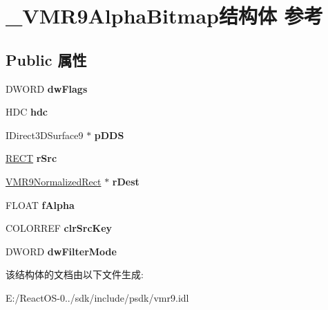 \hypertarget{struct___v_m_r9_alpha_bitmap}{}\section{\+\_\+\+V\+M\+R9\+Alpha\+Bitmap结构体 参考}
\label{struct___v_m_r9_alpha_bitmap}
\subsection*{Public 属性}
\begin{DoxyCompactItemize}
\item 
\mbox{\label{struct___v_m_r9_alpha_bitmap_a636a27f18c993a3f0f634394f131d313}} 
D\+W\+O\+RD {\bfseries dw\+Flags}
\item 
\mbox{\label{struct___v_m_r9_alpha_bitmap_aec73d22084421d7662538f43f9017186}} 
H\+DC {\bfseries hdc}
\item 
\mbox{\label{struct___v_m_r9_alpha_bitmap_aa9881369be0a7c378e23ecf8731e839a}} 
I\+Direct3\+D\+Surface9 $\ast$ {\bfseries p\+D\+DS}
\item 
\mbox{\label{struct___v_m_r9_alpha_bitmap_aae9b8999fcf7f16fa753006c8b8baf45}} 
\hyperlink{structtag_r_e_c_t}{R\+E\+CT} {\bfseries r\+Src}
\item 
\mbox{\label{struct___v_m_r9_alpha_bitmap_a414035588bbcd12d25d8e8dbceff1338}} 
\hyperlink{struct___v_m_r9_normalized_rect}{V\+M\+R9\+Normalized\+Rect} $\ast$ {\bfseries r\+Dest}
\item 
\mbox{\label{struct___v_m_r9_alpha_bitmap_a50c1dd515dd48f57ff95a9fe245d55f1}} 
F\+L\+O\+AT {\bfseries f\+Alpha}
\item 
\mbox{\label{struct___v_m_r9_alpha_bitmap_a257f5684eb3873d692be8d4f844078fc}} 
C\+O\+L\+O\+R\+R\+EF {\bfseries clr\+Src\+Key}
\item 
\mbox{\label{struct___v_m_r9_alpha_bitmap_a218fb9532b76883e6d98f775876d2853}} 
D\+W\+O\+RD {\bfseries dw\+Filter\+Mode}
\end{DoxyCompactItemize}


该结构体的文档由以下文件生成\+:\begin{DoxyCompactItemize}
\item 
E\+:/\+React\+O\+S-\/0../sdk/include/psdk/vmr9.\+idl\end{DoxyCompactItemize}

